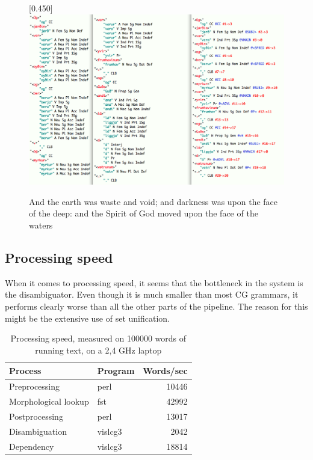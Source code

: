 \documentclass[11pt]{article}
\begin{document}
\begin{figure}[p]
\begin{center}
\scalebox{0.450}[0.450]{\includegraphics{img/frumhavinum.png}}
\caption{And the earth was waste and void; and darkness was upon the face of the deep: and the Spirit of God moved upon the face of the waters}
\label{sent3}
\end{center}
\end{figure}
 
\subsection{Processing speed}

When it comes to processing speed, it seems that the bottleneck in the system is the disambiguator. Even though it is much smaller than most CG grammars, it performs clearly worse than all the other parts of the pipeline. The reason for this might be the extensive use of set unification.


\begin{table}[htdp]
\caption{Processing speed, measured on 100000 words of running text, on a 2,4 GHz laptop}
\begin{center}
\begin{tabular}{|l|l|r|}
\hline
Process & Program & Words/sec \\
\hline
Preprocessing & perl &10446 \\
Morphological lookup & fst & 42992 \\
Postprocessing & perl & 13017 \\
Disambiguation & vislcg3 & 2042 \\
Dependency & vislcg3 & 18814 \\
\hline
\end{tabular}
\end{center}
\label{time}
\end{table}%
\end{document}
